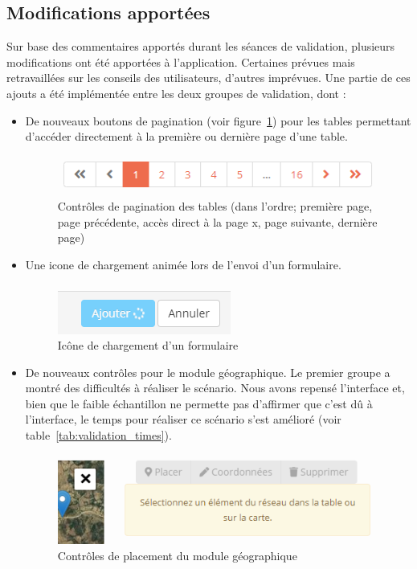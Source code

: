 \documentclass{EPL-master-thesis-covers-FR}
\begin{document}
			\subsection*{Modifications apportées}

				Sur base des commentaires apportés durant les séances de validation, plusieurs modifications ont été apportées à l'application. Certaines prévues mais retravaillées sur les conseils des utilisateurs, d'autres imprévues. Une partie de ces ajouts a été implémentée entre les deux groupes de validation, dont :
				\begin{itemize}
					\item De nouveaux boutons de pagination (voir figure~\ref{fig:screen_pagination}) pour les tables permettant d'accéder directement à la première ou dernière page d'une table.
						\begin{figure}[H]
							\centering
							\includegraphics[scale=0.75]{images/screen_pagination.png}
							\caption{Contrôles de pagination des tables (dans l'ordre; première page, page précédente, accès direct à la page x, page suivante, dernière page)}
							\label{fig:screen_pagination}
						\end{figure}
					\item Une icone de chargement animée lors de l'envoi d'un formulaire.
						\begin{figure}[H]
							\centering
							\includegraphics[scale=0.75]{images/screen_loading.png}
							\caption{Icône de chargement d'un formulaire}
							\label{fig:screen_loading}
						\end{figure}
					\item De nouveaux contrôles pour le module géographique. Le premier groupe a montré des difficultés à réaliser le scénario. Nous avons repensé l'interface et, bien que le faible échantillon ne permette pas d'affirmer que c'est dû à l'interface, le temps pour réaliser ce scénario s'est amélioré (voir table~\ref{tab:validation_times}).
						\begin{figure}[H]
							\centering
							\includegraphics[scale=0.75]{images/screen_gis_small.png}
							\caption{Contrôles de placement du module géographique}
							\label{fig:screen_gis_small}
						\end{figure}
				\end{itemize}
\end{document}
